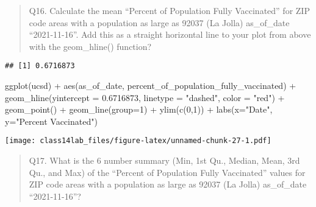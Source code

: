 \documentclass[
]{article}
\newenvironment{Shaded}{\begin{snugshade}}{\end{snugshade}}
\newcommand{\AttributeTok}[1]{\textcolor[rgb]{0.77,0.63,0.00}{#1}}
\newcommand{\ConstantTok}[1]{\textcolor[rgb]{0.00,0.00,0.00}{#1}}
\newcommand{\DecValTok}[1]{\textcolor[rgb]{0.00,0.00,0.81}{#1}}
\newcommand{\FloatTok}[1]{\textcolor[rgb]{0.00,0.00,0.81}{#1}}
\newcommand{\FunctionTok}[1]{\textcolor[rgb]{0.00,0.00,0.00}{#1}}
\newcommand{\NormalTok}[1]{#1}
\newcommand{\SpecialCharTok}[1]{\textcolor[rgb]{0.00,0.00,0.00}{#1}}
\newcommand{\StringTok}[1]{\textcolor[rgb]{0.31,0.60,0.02}{#1}}
\begin{document}
\begin{quote}
Q16. Calculate the mean ``Percent of Population Fully Vaccinated'' for
ZIP code areas with a population as large as 92037 (La Jolla)
as\_of\_date ``2021-11-16''. Add this as a straight horizontal line to
your plot from above with the geom\_hline() function?
\end{quote}

\begin{Shaded}
\end{Shaded}

\begin{verbatim}
## [1] 0.6716873
\end{verbatim}

\begin{Shaded}
\begin{Highlighting}[]
\FunctionTok{ggplot}\NormalTok{(ucsd) }\SpecialCharTok{+}
  \FunctionTok{aes}\NormalTok{(as\_of\_date, percent\_of\_population\_fully\_vaccinated) }\SpecialCharTok{+} 
  \FunctionTok{geom\_hline}\NormalTok{(}\AttributeTok{yintercept =} \FloatTok{0.6716873}\NormalTok{, }\AttributeTok{linetype =} \StringTok{"dashed"}\NormalTok{, }\AttributeTok{color =} \StringTok{"red"}\NormalTok{) }\SpecialCharTok{+}
  \FunctionTok{geom\_point}\NormalTok{() }\SpecialCharTok{+}
  \FunctionTok{geom\_line}\NormalTok{(}\AttributeTok{group=}\DecValTok{1}\NormalTok{) }\SpecialCharTok{+}
  \FunctionTok{ylim}\NormalTok{(}\FunctionTok{c}\NormalTok{(}\DecValTok{0}\NormalTok{,}\DecValTok{1}\NormalTok{)) }\SpecialCharTok{+}
  \FunctionTok{labs}\NormalTok{(}\AttributeTok{x=}\StringTok{"Date"}\NormalTok{, }\AttributeTok{y=}\StringTok{"Percent Vaccinated"}\NormalTok{)}
\end{Highlighting}
\end{Shaded}

\texttt{[image: class14lab\_files/figure-latex/unnamed-chunk-27-1.pdf]}

\begin{quote}
Q17. What is the 6 number summary (Min, 1st Qu., Median, Mean, 3rd Qu.,
and Max) of the ``Percent of Population Fully Vaccinated'' values for
ZIP code areas with a population as large as 92037 (La Jolla)
as\_of\_date ``2021-11-16''?
\end{quote}
\end{document}
